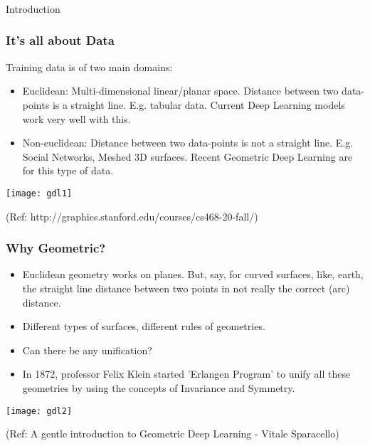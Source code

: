 \begin{frame}[fragile]\frametitle{}
\begin{center}
{\Large Introduction}
\end{center}
\end{frame}


\begin{frame}[fragile]\frametitle{It's all about Data}

Training data is of two main domains:
\begin{itemize}
\item Euclidean: Multi-dimensional linear/planar space. Distance between two data-points is a straight line. E.g. tabular data. Current Deep Learning models work very well with this.
\item Non-euclidean: Distance between two data-points is not a straight line. E.g. Social Networks, Meshed 3D surfaces. Recent Geometric Deep Learning are for this type of data.
\end{itemize}
	  
\begin{center}
\texttt{[image: gdl1]}
\end{center}

{\tiny (Ref: http://graphics.stanford.edu/courses/cs468-20-fall/)}

\end{frame}

\begin{frame}[fragile]\frametitle{Why Geometric?}

\begin{itemize}
\item Euclidean geometry works on planes. But, say, for curved surfaces, like, earth, the straight line distance between two points in not really the correct (arc) distance.
\item Different types of surfaces, different rules of geometries.
\item Can there be any unification?
\item In 1872, professor Felix Klein started 'Erlangen Program' to unify all these geometries by using the concepts of Invariance and Symmetry.
\end{itemize}
	  
\begin{center}
\texttt{[image: gdl2]}
\end{center}

{\tiny (Ref: A gentle introduction to Geometric Deep Learning - Vitale Sparacello)}

\end{frame}

